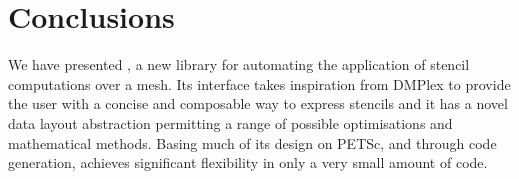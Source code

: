 \section{Conclusions}
\label{sec:conclusions}

We have presented , a new library for automating the application of stencil computations over a mesh.
Its interface takes inspiration from DMPlex to provide the user with a concise and composable way to express stencils and it has a novel data layout abstraction permitting a range of possible optimisations and mathematical methods.
Basing much of its design on PETSc, and through code generation,  achieves significant flexibility in only a very small amount of code.

